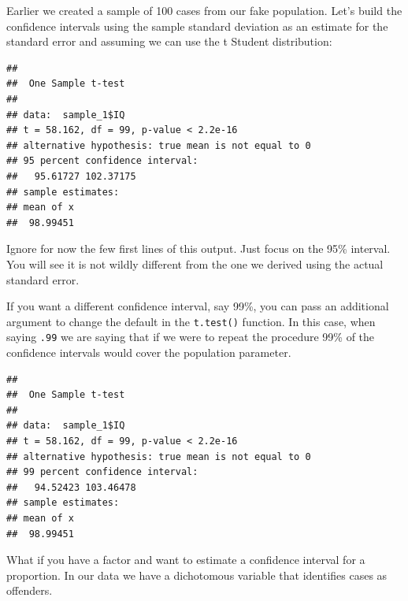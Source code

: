 \documentclass[
]{book}
\newenvironment{Shaded}{\begin{snugshade}}{\end{snugshade}}
\newcommand{\AttributeTok}[1]{\textcolor[rgb]{0.77,0.63,0.00}{#1}}
\newcommand{\DecValTok}[1]{\textcolor[rgb]{0.00,0.00,0.81}{#1}}
\newcommand{\FunctionTok}[1]{\textcolor[rgb]{0.00,0.00,0.00}{#1}}
\newcommand{\NormalTok}[1]{#1}
\newcommand{\SpecialCharTok}[1]{\textcolor[rgb]{0.00,0.00,0.00}{#1}}
\begin{document}
Earlier we created a sample of 100 cases from our fake population. Let's build the confidence intervals using the sample standard deviation as an estimate for the standard error and assuming we can use the t Student distribution:

\begin{Shaded}
\end{Shaded}

\begin{verbatim}
## 
##  One Sample t-test
## 
## data:  sample_1$IQ
## t = 58.162, df = 99, p-value < 2.2e-16
## alternative hypothesis: true mean is not equal to 0
## 95 percent confidence interval:
##   95.61727 102.37175
## sample estimates:
## mean of x 
##  98.99451
\end{verbatim}

Ignore for now the few first lines of this output. Just focus on the 95\% interval. You will see it is not wildly different from the one we derived using the actual standard error.

If you want a different confidence interval, say 99\%, you can pass an additional argument to change the default in the \texttt{t.test()} function. In this case, when saying \texttt{.99} we are saying that if we were to repeat the procedure 99\% of the confidence intervals would cover the population parameter.

\begin{Shaded}
\end{Shaded}

\begin{verbatim}
## 
##  One Sample t-test
## 
## data:  sample_1$IQ
## t = 58.162, df = 99, p-value < 2.2e-16
## alternative hypothesis: true mean is not equal to 0
## 99 percent confidence interval:
##   94.52423 103.46478
## sample estimates:
## mean of x 
##  98.99451
\end{verbatim}

What if you have a factor and want to estimate a confidence interval for a proportion. In our data we have a dichotomous variable that identifies cases as offenders.
\end{document}
